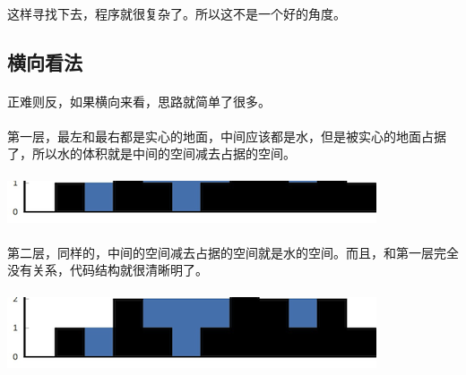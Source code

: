 \documentclass[UTF-8, 12pt]{ctexart}
\begin{document}
    \paragraph{}
    这样寻找下去，程序就很复杂了。所以这不是一个好的角度。

    \subsection{横向看法}
    \paragraph{}
    正难则反，如果横向来看，思路就简单了很多。
    \paragraph{}
    第一层，最左和最右都是实心的地面，中间应该都是水，但是被实心的地面占据了，所以水的体积就是中间的空间减去占据的空间。\\
    \paragraph{}
    \includegraphics[width = .9\textwidth]{Water_3.png}
    \paragraph{}
    第二层，同样的，中间的空间减去占据的空间就是水的空间。而且，和第一层完全没有关系，代码结构就很清晰明了。
    \paragraph{}
    \includegraphics[width = .9\textwidth]{Water_4.png}
\end{document}
